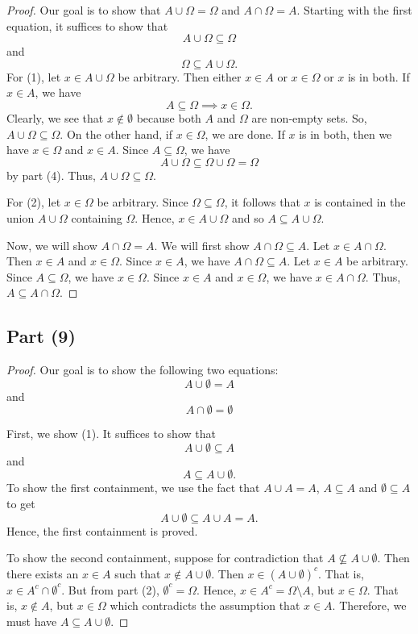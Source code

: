 \documentclass[a4paper]{article}
\begin{document}
\begin{proof}
Our goal is to show that \( A \cup \Omega = \Omega \) and \( A \cap \Omega = A  \). Starting with the first equation, it suffices to show that 
\[  A \cup \Omega \subseteq \Omega \tag{1} \]
and
\[  \Omega \subseteq A \cup \Omega. \tag{2} \]
For (1), let \( x \in A \cup \Omega \) be arbitrary. Then either \( x \in A  \) or \( x \in \Omega \) or \( x  \) is in both. If \( x \in A  \), we have
\[  A \subseteq \Omega \implies x \in \Omega. \]
Clearly, we see that \( x \not\in \emptyset  \) because both \( A  \) and \( \Omega \) are non-empty sets. 
So, \( A \cup \Omega \subseteq \Omega \). On the other hand, if \( x \in \Omega \), we are done. If \( x  \) is in both, then we have \( x \in \Omega \) and \( x \in A  \). Since \( A \subseteq \Omega \), we have 
\[  A \cup \Omega \subseteq \Omega \cup \Omega = \Omega  \]
by part (4). Thus, \( A \cup \Omega \subseteq  \Omega \). 

For (2), let \( x \in \Omega \) be arbitrary. Since \( \Omega \subseteq \Omega \), it follows that \( x  \) is contained in the union \( A \cup \Omega \) containing \( \Omega \). Hence, \( x \in A \cup \Omega \) and so \( A \subseteq A \cup \Omega \).

Now, we will show \( A \cap \Omega = A  \). We will first show \( A \cap \Omega \subseteq  A  \). Let \( x \in A \cap \Omega \). Then \( x \in A  \) and \( x \in \Omega \). Since \( x \in A  \), we have \( A \cap \Omega \subseteq  A  \). Let \( x \in A  \) be arbitrary. Since \( A \subseteq  \Omega \), we have \( x \in \Omega \). Since \( x \in A  \) and \( x \in \Omega \), we have \( x \in A \cap \Omega \). Thus, \( A \subseteq  A \cap \Omega \). 
\end{proof}

\subsection*{Part (9)}

\begin{proof}
Our goal is to show the following two equations:
\[  A \cup \emptyset = A \tag{1} \]
and 
\[  A \cap \emptyset = \emptyset \tag{2}  \]

First, we show (1). It suffices to show that \[ A \cup \emptyset \subseteq A \tag{*}   \]  
and 
\[ A \subseteq  A \cup \emptyset. \tag{**} \] To show the first containment, we use the fact that \( A \cup A = A  \), \( A \subseteq  A  \) and \( \emptyset \subseteq A  \) to get  
\[  A \cup \emptyset \subseteq  A \cup A  = A.  \]
Hence, the first containment is proved.

To show the second containment, suppose for contradiction that \( A \not\subseteq A \cup \emptyset \). Then there exists an \( x \in A  \) such that \( x \not\in A \cup \emptyset \). Then \( x \in (A \cup \emptyset)^{c} \). That is, \( x \in A^{c} \cap \emptyset^{c} \). But from part (2), \( \emptyset^{c} = \Omega \). Hence, \( x \in A^{c} = \Omega \setminus  A  \), but \( x \in \Omega \). That is, \( x \notin A  \), but \( x \in \Omega \) which contradicts the assumption that \( x \in A  \). Therefore, we must have \( A  \subseteq  A \cup \emptyset  \).  

\end{proof}
\end{document}
